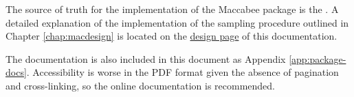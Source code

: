 \documentclass[../main.tex]{subfiles}
\begin{document}
The source of truth for the implementation of the Maccabee package is the . A detailed explanation of the implementation of the sampling procedure outlined in Chapter \ref{chap:macdesign} is located on the \href{\RTDurl/design.html}{design page} of this documentation.

\vspace{\baselineskip}

The documentation is also included in this document as Appendix \ref{app:package-docs}. Accessibility is worse in the PDF format given the absence of pagination and cross-linking, so the online documentation is recommended.
\end{document}
